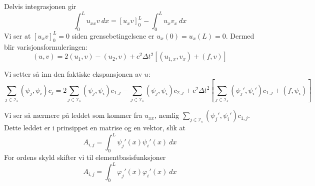 \documentclass[a4paper, 10pt]{article}
\newcommand{\mc}{\mathcal}
\begin{document}
Delvis integrasjonen gir
\begin{equation}
	\int_0^L u_{xx} v \ dx = [u_xv]_0^L - \int_0^L u_xv_x \ dx
\end{equation}
Vi ser at $[u_xv]_0^L = 0$ siden grensebetingelsene er $u_x(0) = u_x(L) = 0$.
Dermed blir varisjonsformuleringen:
\begin{equation}
	(u, v) = 2(u_1, v) - (u_2, v) + c^2\Delta t^2\left[(u_{1,x}, v_x) + (f, v)\right]
\end{equation}

Vi setter så inn den faktiske ekspansjonen av $u$:
\begin{equation}
	\sum_{j \in \mc{I}_s } (\psi_j, \psi_i)c_j = 2\sum_{j \in \mc{I}_s }(\psi_j, \psi_i)c_{1, j} - \sum_{j \in \mc{I}_s }(\psi_j, \psi_i)c_{2, j} + c^2\Delta t^2 \left[\sum_{j \in \mc{I}_s } (\psi_j', \psi_i')c_{1, j} + (f, \psi_i)\right]
\end{equation}

Vi ser så nærmere på leddet som kommer fra $u_{xx}$, nemlig $\sum_{j \in \mc{I}_s } (\psi_j', \psi_i')c_{1, j}$. 
Dette leddet er i prinsippet en matrise og en vektor, slik at 
\begin{equation}
	A_{i, j} = \int_0^L \psi_j'(x)\psi_i'(x) \ dx
\end{equation}
For ordens skyld skifter vi til elementbasisfunksjoner
\begin{equation}
	A_{i, j} = \int_0^L \varphi_j'(x)\varphi_i'(x) \ dx
\end{equation}
\end{document}
